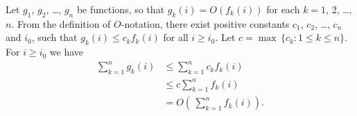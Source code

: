 \exercise
Let $g_1$, $g_2$, \dots, $g_n$ be functions, so that $g_k(i)=O(f_k(i))$ for each $k=1$, 2, \dots, $n$.
From the definition of $O$-notation, there exist positive constants $c_1$, $c_2$, \dots, $c_n$ and $i_0$, such that $g_k(i)\le c_k f_k(i)$ for all $i\ge i_0$.
Let $c=\max\,\{c_k: 1\le k\le n\}$.
For $i\ge i_0$ we have
\begin{align*}
    \sum_{k=1}^n g_k(i) &\le \sum_{k=1}^n c_k f_k(i) \\
    &\le c\sum_{k=1}^n f_k(i) \\
    &= O\left(\,\sum_{k=1}^n f_k(i)\right).
\end{align*}
